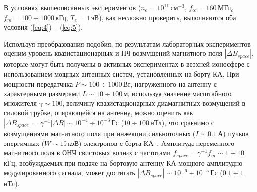 \documentclass[autoref,10pt]{disser}
\begin{document}
В условиях вышеописанных экспериментов ($n_{e}=10^{11}$\,см$^{-3}$, $f_{ce}=160$\,МГц, $f_{m}=100\div1000$\,кГц, $T_e=1$\,эВ), как несложно проверить, выполняются оба условия (\ref{eq:4}) -- (\ref{eq:5}).

Используя преобразования подобия, по результатам лабораторных экспериментов оценим уровень квазистационарных и НЧ возмущений магнитного поля $|\Delta B_{space}|$, которые могут быть получены в активных экспериментах в верхней ионосфере с использованием мощных антенных систем, установленных на борту КА. При мощности передатчика $P\sim100\div1000$\,Вт, нагруженного на антенну с характерными размерами $L\sim10\div100$\,м, используя значение масштабного множителя $\gamma\sim 100$, величину квазистационарных диамагнитных возмущений в силовой трубке, опирающейся на антенну, можно оценить как $|\Delta{}B_{space}|=\gamma{}^{-1}|\Delta{}B|\sim 10^{-4}\div 10^{-3}$\,Гс ($10\div100$\,нТл), что сравнимо с возмущениями магнитного поля при инжекции сильноточных ($I\sim 0.1$\,А) пучков энергичных ($W\sim 10$\,кэВ) электронов с борта КА~\cite{Orajevskiy}. Амплитуда переменного магнитного поля в ОНЧ свистовых волнах с частотами $f_{space}=\gamma{}^{-1} f_m\sim 1\div 10$\,кГц, возбуждаемых при подаче на бортовую антенну КА мощного амплитудно-модулированного сигнала, может достигать $|\Delta{}B_{space}|\sim 10^{-6}\div 10^{-5}$\,Гс ($0.1\div 1$\,нТл).  
\end{document}
